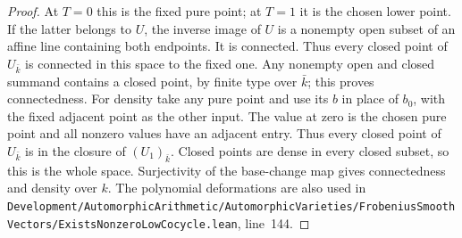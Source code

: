 \documentclass[a4paper,11pt]{article}
\theoremstyle{definition}
\theoremstyle{remark}
\newcommand{\srcloc}[2]{{\small\nolinkurl{#1.lean}}, line~#2}
\numberwithin{equation}{section}
\begin{document}
\begin{proof}
At \(T=0\) this is the fixed pure point; at \(T=1\) it is
the chosen lower point. If the latter belongs to \(U\), the
inverse image of \(U\) is a nonempty open subset of an affine
line containing both endpoints. It is connected. Thus every
closed point of \(U_{\bar k}\) is connected in this space to
the fixed one. Any nonempty open and closed summand contains
a closed point, by finite type over \(\bar k\); this proves
connectedness. For density take any pure point and use its
\(b\) in place of \(b_0\), with the fixed adjacent point
as the other input. The value at zero is the chosen pure
point and all nonzero values have an adjacent entry. Thus
every closed point of \(U_{\bar k}\) is in the closure of
\((U_1)_{\bar k}\). Closed points are dense in every closed
subset, so this is the whole space. Surjectivity of the
base-change map gives connectedness and density over \(k\).
The polynomial deformations are also used in
\srcloc{Development/AutomorphicArithmetic/AutomorphicVarieties/FrobeniusSmoothVectors/ExistsNonzeroLowCocycle}{144}.
\end{proof}
\end{document}
